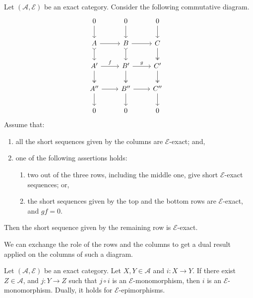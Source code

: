 \begin{lemma} \label{lem:3x3}
Let $(\mathscr{A}, \mathcal{E})$ be an exact category. Consider the following commutative diagram.
\[\begin{tikzcd}
         & 0 & 0 & 0 &  \\
	& A & B  & C &   \\
      & A' & B' & C' &  \\
       & A'' & B'' & C'' &  \\
       & 0 & 0 & 0 & 
	\arrow[from=2-2, to=2-3]
	\arrow[from=2-3, to=2-4]
	\arrow["f",from=3-2, to=3-3]
	\arrow["g",from=3-3, to=3-4]
	\arrow[from=4-2, to=4-3]
	\arrow[from=4-3, to=4-4]
        \arrow[from=4-2, to=5-2]
	\arrow[two heads, from=3-2, to=4-2]
	\arrow[tail,from=2-2, to=3-2]
	\arrow[from=1-2, to=2-2]
        \arrow[from=4-3, to=5-3]
	\arrow[two heads, from=3-3, to=4-3]
	\arrow[tail,from=2-3, to=3-3]
	\arrow[from=1-3, to=2-3]
        \arrow[from=4-4, to=5-4]
	\arrow[two heads, from=3-4, to=4-4]
	\arrow[two heads,from=2-4, to=3-4]
	\arrow[from=1-4, to=2-4]
\end{tikzcd} \]
Assume that:
\begin{enumerate}[label=$\bullet$, itemsep=1mm]
    \item all the short sequences given by the columns are $\mathcal{E}$-exact; and,
    \item one of the following assertions holds:
    \begin{enumerate}[label=$\bullet$,itemsep=1mm]
        \item two out of the three rows, including the middle one, give short $\mathcal{E}$-exact sequences; or,
        \item the short sequences given by the top and the bottom rows are $\mathcal{E}$-exact, and $gf = 0$.
    \end{enumerate}
\end{enumerate}
Then the short sequence given by the remaining row is $\mathcal{E}$-exact.
\end{lemma}

\begin{remark} \label{rem:dual3x3}
    We can exchange the role of the rows and the columns to get a dual result applied on the columns of such a diagram.
\end{remark}

\begin{lemma} \label{lem:obscure}
Let $(\mathscr{A}, \mathcal{E})$ be an exact category. Let $X,Y \in \mathscr{A}$ and $i : X \longrightarrow Y$. If there exist $Z \in \mathscr{A}$, and $j : Y \longrightarrow Z$ such that $j \circ i$ is an $\mathcal{E}$-monomorphism, then $i$ is an $\mathcal{E}$-monomorphism. Dually, it holds for $\mathcal{E}$-epimorphisms.
\end{lemma}

